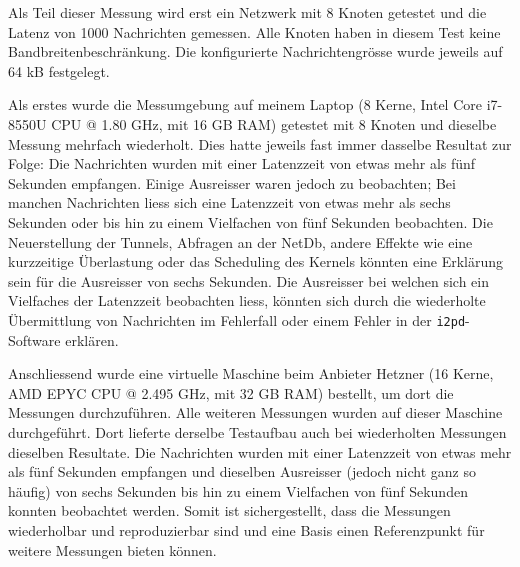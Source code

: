 Als Teil dieser Messung wird erst ein Netzwerk mit 8 Knoten getestet und die Latenz von 1000 Nachrichten gemessen.
Alle Knoten haben in diesem Test keine Bandbreitenbeschränkung.
Die konfigurierte Nachrichtengrösse wurde jeweils auf 64 kB festgelegt.

Als erstes wurde die Messumgebung auf meinem Laptop (8 Kerne, Intel Core i7-8550U CPU @ 1.80 GHz, mit 16 GB RAM) getestet mit 8 Knoten und dieselbe Messung mehrfach wiederholt.
Dies hatte jeweils fast immer dasselbe Resultat zur Folge:
Die Nachrichten wurden mit einer Latenzzeit von etwas mehr als fünf Sekunden empfangen.
Einige Ausreisser waren jedoch zu beobachten;
Bei manchen Nachrichten liess sich eine Latenzzeit von etwas mehr als sechs Sekunden oder bis hin zu einem Vielfachen von fünf Sekunden beobachten.
Die Neuerstellung der Tunnels, Abfragen an der NetDb, andere Effekte wie eine kurzzeitige Überlastung oder das Scheduling des Kernels könnten eine Erklärung sein für die Ausreisser von sechs Sekunden.
Die Ausreisser bei welchen sich ein Vielfaches der Latenzzeit beobachten liess,
könnten sich durch die wiederholte Übermittlung von Nachrichten im Fehlerfall
oder einem Fehler in der \lstinline|i2pd|-Software erklären.

Anschliessend wurde eine virtuelle Maschine beim Anbieter Hetzner (16 Kerne, AMD EPYC CPU @ 2.495 GHz, mit 32 GB RAM) bestellt, um dort die Messungen durchzuführen.
Alle weiteren Messungen wurden auf dieser Maschine durchgeführt.
Dort lieferte derselbe Testaufbau auch bei wiederholten Messungen dieselben Resultate.
Die Nachrichten wurden mit einer Latenzzeit von etwas mehr als fünf Sekunden empfangen
und dieselben Ausreisser (jedoch nicht ganz so häufig) von sechs Sekunden bis hin zu einem Vielfachen von fünf Sekunden konnten beobachtet werden.
Somit ist sichergestellt, dass die Messungen wiederholbar und reproduzierbar sind und eine Basis einen Referenzpunkt für weitere Messungen bieten können.

%
%
%



